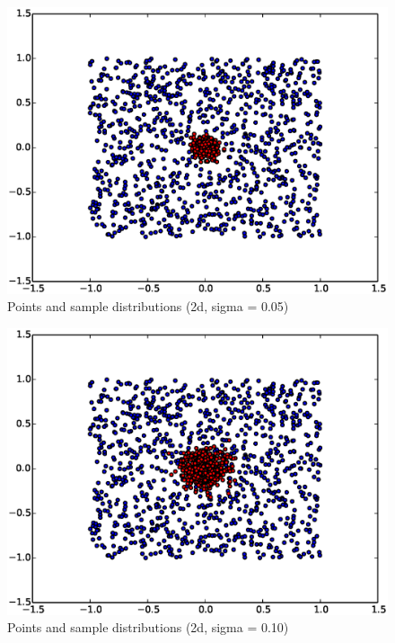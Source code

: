 \documentclass[mcs]{scsthesis}
\begin{document}
\begin{figure}
\begin{center}
\includegraphics[scale=0.5]{diagrams/pts_plot_sigma0.05.eps}
\caption{Points and sample distributions (2d, sigma = 0.05)}
\label{fig:points_and_sample_2d_0_05}
\end{center}
\end{figure}

\begin{figure}
\begin{center}
\includegraphics[scale=0.5]{diagrams/pts_plot_sigma0.10.eps}
\caption{Points and sample distributions (2d, sigma = 0.10)}
\label{fig:points_and_sample_2d_0_10}
\end{center}
\end{figure}
\end{document}
